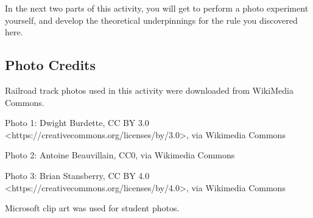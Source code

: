 \documentclass{ximera}
\begin{document}
In the next two parts of this activity, you will get to perform a photo experiment yourself, and develop the theoretical underpinnings for the rule you discovered here.

\subsection*{Photo Credits}

Railroad track photos used in this activity were downloaded from WikiMedia Commons.  

Photo 1: Dwight Burdette, CC BY 3.0 <https://creativecommons.org/licenses/by/3.0>, via Wikimedia Commons

Photo 2: Antoine Beauvillain, CC0, via Wikimedia Commons

Photo 3: Brian Stansberry, CC BY 4.0 <https://creativecommons.org/licenses/by/4.0>, via Wikimedia Commons

Microsoft clip art was used for student photos.
\end{document}
